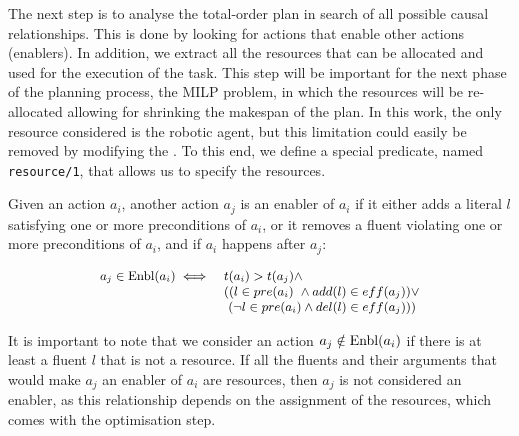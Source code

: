 The next step is to analyse the total-order plan in search of all possible causal relationships. This is done by
looking for actions that enable other actions (enablers). In addition, we extract all the resources that can be allocated
and used for the execution of the task. This step will be important for the next phase of the planning process, the MILP problem, in which 
the resources will be re-allocated allowing for shrinking the makespan of the plan.
%
In this work, the only resource considered is the robotic agent, but this limitation could easily be removed by modifying the \kb.  To this end,  we define a special predicate, named \texttt{resource/1}, that allows us to specify the resources.

Given an action $a_i$, another action $a_j$ is an enabler of $a_i$ if it either adds a literal $l$ satisfying one or more preconditions of $a_i$, or it removes a fluent violating one or more preconditions of $a_i$, and if $a_i$ happens after $a_j$: 

\begin{equation}
\small
\begin{array}{rl}
     a_j \in \text{Enbl}(a_i) \iff & t(a_i) > t(a_j) \wedge \\
                            & ((l\in pre(a_i)~ \wedge add(l)\in eff(a_j)) \vee\\
                            & \,\,(\lnot l\in pre(a_i) \wedge del(l)\in eff(a_j)))
\end{array}
\label{eq:enablers}
\end{equation}

It is important to note that we consider an action $a_j\notin\text{Enbl}(a_i)$ if there is at least a fluent $l$ that is not a resource. If all the fluents and their arguments that would make $a_j$ an enabler of $a_i$ are resources, then $a_j$ is not considered an enabler, as this relationship depends on the assignment of the resources, which comes with the optimisation step. 

